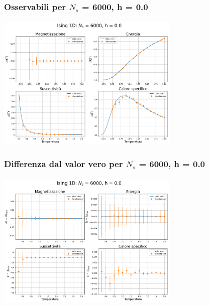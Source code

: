 \begin{frame}
    \frametitle{Osservabili per $N_s$ = 6000, h = 0.0}
    \framesubtitle{}

    \centering
    \includegraphics[width=0.65\textwidth]{Immagini/backupIsing1D/obs_6000_0.0.png}

\end{frame}



\begin{frame}
    \frametitle{Differenza dal valor vero per $N_s$ = 6000, h = 0.0}
    \framesubtitle{}

    \centering
    \includegraphics[width=0.65\textwidth]{Immagini/backupIsing1D/obs_6000_0.0_diff.png}

\end{frame}



